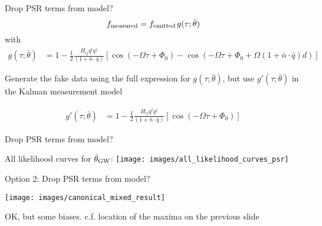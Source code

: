 \documentclass[10pt]{beamer}
\begin{document}
\begin{frame}{Drop PSR terms from model?}
	 \begin{equation}
		f_{\rm measured} = f_{\rm emitted} \, g(\tau; \bar{\theta})
		\label{eq:measureent}
	\end{equation}
	with
	\begin{align}
		g(\tau; \bar{\theta}) 
		& = 1 - \frac{1}{2} \frac{ H_{ij}q^i q^j }{(1 + \bar{n}\cdot \bar{q}) } \left[ \cos(-\Omega \tau +\Phi_0) - \cos(-\Omega \tau +\Phi_0 + \Omega (1 + \bar{n}\cdot \bar{q})  d) \right]
	\end{align}

Generate the fake data using the full expression for $g(\tau; \bar{\theta})$, but use $g'(\tau; \bar{\theta})$ in the Kalman measurement model
	
		\begin{align}
		g'(\tau; \bar{\theta}) 
		& = 1 - \frac{1}{2} \frac{ H_{ij}q^i q^j }{(1 + \bar{n}\cdot \bar{q}) } \left[ \cos(-\Omega \tau +\Phi_0) \right]
	\end{align}
\end{frame}


\begin{frame}{Drop PSR terms from model?}
	
		All likelihood curves for $\bar{\theta}_{\rm GW}$:
		\texttt{[image: images/all\_likelihood\_curves\_psr]}

\end{frame}


\begin{frame}{Option 2: Drop PSR terms from model?}
	
	
	\texttt{[image: images/canonical\_mixed\_result]}
	
	OK, but some biases. c.f. location of the maxima on the previous slide
\end{frame}





	
\end{document}
